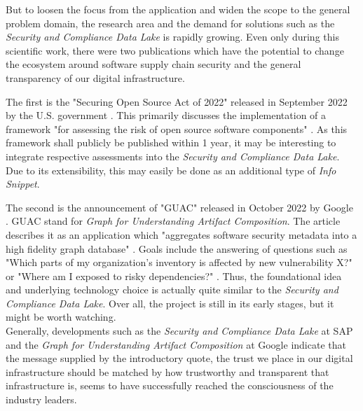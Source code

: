But to loosen the focus from the application and widen the scope to the general problem domain, the research area and the demand for solutions such as the \emph{Security and Compliance Data Lake} is rapidly growing. Even only during this scientific work, there were two publications which have the potential to change the ecosystem around software supply chain security and the general transparency of our digital infrastructure.\par
The first is the "Securing Open Source Act of 2022" released in September 2022 by the U.S. government \cite{SecuringOpenSourceAct}. This primarily discusses the implementation of a framework "for assessing the risk of open source software components" \cite{SecuringOpenSourceAct}. As this framework shall publicly be published within 1 year, it may be interesting to integrate respective assessments into the \emph{Security and Compliance Data Lake}. Due to its extensibility, this may easily be done as an additional type of \emph{Info Snippet}.\par
The second is the announcement of "GUAC" released in October 2022 by Google \cite{GUAC}. GUAC stand for \emph{Graph for Understanding Artifact Composition}. The article describes it as an application which "aggregates software security metadata into a high fidelity graph database" \cite{GUAC}. Goals include the answering of questions such as "Which parts of my organization's inventory is affected by new vulnerability X?" or "Where am I exposed to risky dependencies?" \cite{GUAC}. Thus, the foundational idea and underlying technology choice is actually quite similar to the \emph{Security and Compliance Data Lake}. Over all, the project is still in its early stages, but it might be worth watching.\\

Generally, developments such as the \emph{Security and Compliance Data Lake} at SAP and the \emph{Graph for Understanding Artifact Composition} at Google indicate that the message supplied by the introductory quote, the trust we place in our digital infrastructure should be matched by how trustworthy and transparent that infrastructure is, seems to have successfully reached the consciousness of the industry leaders.



